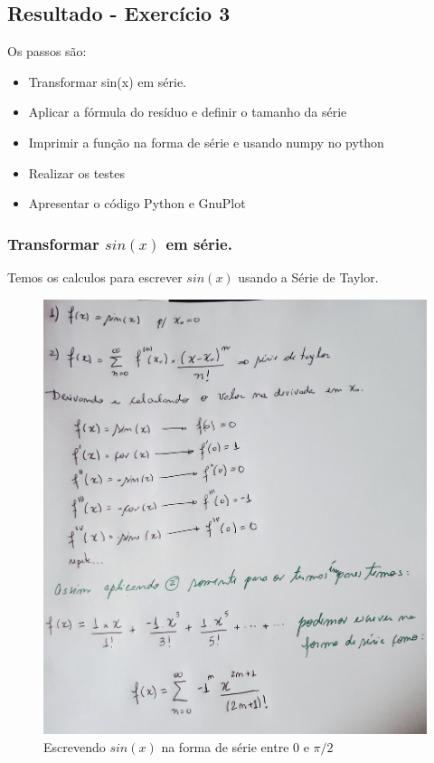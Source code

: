 \subsection{Resultado - Exercício 3}

Os passos são:
\begin{itemize}[leftmargin=3.5em, itemsep=-.5mm, topsep=0.5mm]
    \item Transformar sin(x) em série.
    \item Aplicar a fórmula do resíduo e definir o tamanho da série
    \item Imprimir a função na forma de série e usando numpy no python
    \item Realizar os testes
    \item Apresentar o código Python e GnuPlot
 \end{itemize}

\newpage

\subsubsection{Transformar $sin(x)$ em série.}
Temos os calculos para escrever $sin(x)$ usando a Série de Taylor.
\begin{figure}[H]
    \centering
    \includegraphics[width=1.0\textwidth]{imagens/exercicio3_parte_1}
    \caption{Escrevendo $sin(x)$ na forma de série entre $0$ e $\pi/2$}
    \label{fig:lista_exercicio3_parte1}
\end{figure}
\newpage

